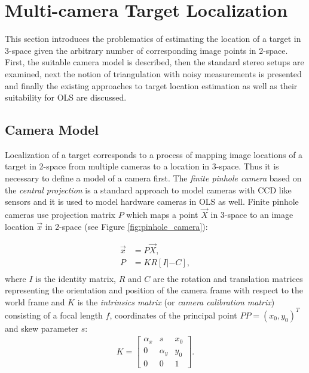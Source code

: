 \section{Multi-camera Target Localization} \label{txt:multi_camera_target_localization}

This section introduces the problematics of estimating the location of a target in 3-space given the arbitrary number of corresponding image points in 2-space. First, the suitable camera model is described, then the standard stereo setups are examined, next the notion of triangulation with noisy measurements is presented and finally the existing approaches to target location estimation as well as their suitability for OLS are discussed.

\subsection{Camera Model}

Localization of a target corresponds to a process of mapping image locations of a target in 2-space from multiple cameras to a location in 3-space. Thus it is necessary to define a model of a camera first. The \textit{finite pinhole camera} based on the \textit{central projection} is a standard approach to model cameras with CCD like sensors \cite{Hartley:2003:MVG:861369} and it is used to model hardware cameras in OLS as well. Finite pinhole cameras use projection matrix $P$ which maps a point $\vec{X}$ in 3-space to an image location $\vec{x}$ in 2-space (see Figure \ref{fig:pinhole_camera}):

\begin{align}
	\vec{x} &= P\vec{X},\\
	P &= KR[I|-C],\\
\end{align}
where $I$ is the identity matrix, $R$ and $C$ are the rotation and translation matrices representing the orientation and position of the camera frame with respect to the world frame and $K$ is the \textit{intrinsics matrix} (or \textit{camera calibration matrix}) consisting of a focal length $f$, coordinates of the principal point $PP = (x_{0}, y_{0})^{T}$ and skew parameter $s$:
\begin{align}
	K = \begin{bmatrix}
		\alpha_{x} & s          & x_{0} \\
		0          & \alpha_{y} & y_{0} \\
		0          & 0			& 1
	\end{bmatrix}.
\end{align}

